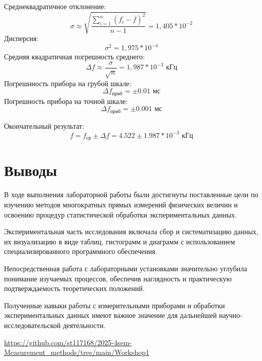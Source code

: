 \clearpage

Среднеквадратичное отклонение:
\begin{equation}
    \sigma \approx \sqrt{\frac{\sum_{i=1}^{n}(f_i-\overline{f})^{2}}{n-1}}=1,405*10^{-2}
\end{equation} 
Дисперсия:
\begin{equation}
    \sigma^2=1,975*10^{-4}
\end{equation}
Средняя квадратичная погрешность среднего:
\begin{equation}
    \Delta f \approx \frac{\sigma}{\sqrt{n}}=1,987*10^{-3} \text{ кГц}
\end{equation}
 Погрешнность прибора на грубой шкале:
\begin{equation}
    \Delta f_\text{приб} = \pm 0.01  \text{ мс}
\end{equation}
Погрешность прибора на точной шкале:
\begin{equation}
    \Delta f_\text{приб} = \pm 0.001  \text{ мс}
\end{equation}

Окончательный результат:
\begin{equation}
    f=f_\text{ср}\pm\Delta f = 4.522 \pm 1.987*10^{-3} \text{ кГц}
\end{equation}

\clearpage
\section{Выводы}
В ходе выполнения лабораторной работы были достигнуты поставленные цели по изучению методов многократных прямых измерений физических величин и освоению процедур статистической обработки экспериментальных данных.

Экспериментальная часть исследования включала сбор и систематизацию данных, их визуализацию в виде таблиц, гистограмм и диаграмм с использованием специализированного программного обеспечения.

Непосредственная работа с лабораторными установками значительно углубила понимание изучаемых процессов, обеспечив наглядность и практическую подтверждаемость теоретических положений. 

Полученные навыки работы с измерительными приборами и обработки экспериментальных данных имеют важное значение для дальнейшей научно-исследовательской деятельности.
\begin{thebibliography}{9}

\url{https://github.com/st117168/2025-4sem-Measurement_methods/tree/main/Workshop1} 

\end{thebibliography}



